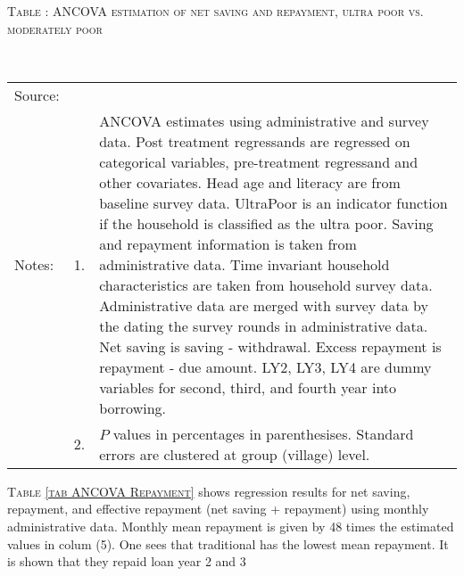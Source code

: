 \hspace{-1cm}\begin{minipage}[t]{14cm}
\hfil\textsc{\normalsize Table \thetable: ANCOVA estimation of net saving and repayment, ultra poor vs. moderately poor\label{tab ANCOVA Repayment time varying poverty}}\\
\setlength{\tabcolsep}{1pt}
\setlength{\baselineskip}{8pt}
\renewcommand{\arraystretch}{.55}
\hspace{-.75cm}\\
\renewcommand{\arraystretch}{.8}
\setlength{\tabcolsep}{1pt}
\begin{tabular}{>{\hfill\scriptsize}p{1cm}<{}>{\hfill\scriptsize}p{.25cm}<{}>{\scriptsize}p{12cm}<{\hfill}}
Source:& \multicolumn{2}{l}{\scriptsize Estimated with GUK administrative and survey data.}\\
Notes: & 1. & ANCOVA estimates using administrative and survey data. Post treatment regressands are regressed on categorical variables, pre-treatment regressand and other covariates. Head age and literacy are from baseline survey data.  \textsf{UltraPoor} is an indicator function if the household is classified as the ultra poor. Saving and repayment information is taken from administrative data. Time invariant household characteristics are taken from household survey data. Administrative data are merged with survey data by the dating the survey rounds in administrative data. Net saving is saving - withdrawal. Excess repayment is repayment - due amount. \textsf{LY2, LY3, LY4} are dummy variables for second, third, and 	fourth year into borrowing.\\
& 2. & $P$ values in percentages in parenthesises. Standard errors are clustered at group (village) level.
\end{tabular}
\end{minipage}


\begin{palepinkleftbar}
\begin{finding}
\textsc{\small Table \ref{tab ANCOVA Repayment}} shows regression results for net saving, repayment, and effective repayment (net saving + repayment) using monthly administrative data. Monthly mean repayment is given by 48 times the estimated values in colum (5). One sees that \textsf{traditional} has the lowest mean repayment. It is shown that they repaid loan year 2 and 3 

\end{finding}
\end{palepinkleftbar}

